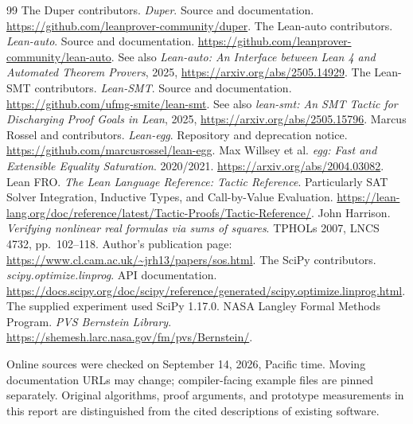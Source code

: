 \documentclass[11pt,letterpaper]{article}
\theoremstyle{definition}
\theoremstyle{remark}
\begin{document}
\begin{thebibliography}{99}
 The Duper contributors. \emph{Duper}. Source and documentation. \url{https://github.com/leanprover-community/duper}.
 The Lean-auto contributors. \emph{Lean-auto}. Source and documentation. \url{https://github.com/leanprover-community/lean-auto}. See also \emph{Lean-auto: An Interface between Lean 4 and Automated Theorem Provers}, 2025, \url{https://arxiv.org/abs/2505.14929}.
 The Lean-SMT contributors. \emph{Lean-SMT}. Source and documentation. \url{https://github.com/ufmg-smite/lean-smt}. See also \emph{lean-smt: An SMT Tactic for Discharging Proof Goals in Lean}, 2025, \url{https://arxiv.org/abs/2505.15796}.
 Marcus Rossel and contributors. \emph{Lean-egg}. Repository and deprecation notice. \url{https://github.com/marcusrossel/lean-egg}.
 Max Willsey et al. \emph{egg: Fast and Extensible Equality Saturation}. 2020/2021. \url{https://arxiv.org/abs/2004.03082}.
 Lean FRO. \emph{The Lean Language Reference: Tactic Reference}. Particularly SAT Solver Integration, Inductive Types, and Call-by-Value Evaluation. \url{https://lean-lang.org/doc/reference/latest/Tactic-Proofs/Tactic-Reference/}.
 John Harrison. \emph{Verifying nonlinear real formulas via sums of squares}. TPHOLs 2007, LNCS 4732, pp.\ 102--118. Author's publication page: \url{https://www.cl.cam.ac.uk/~jrh13/papers/sos.html}.
 The SciPy contributors. \emph{scipy.optimize.linprog}. API documentation. \url{https://docs.scipy.org/doc/scipy/reference/generated/scipy.optimize.linprog.html}. The supplied experiment used SciPy 1.17.0.
 NASA Langley Formal Methods Program. \emph{PVS Bernstein Library}. \url{https://shemesh.larc.nasa.gov/fm/pvs/Bernstein/}.
\end{thebibliography}
\noindent\small Online sources were checked on September 14, 2026, Pacific time. Moving documentation URLs may change; compiler-facing example files are pinned separately. Original algorithms, proof arguments, and prototype measurements in this report are distinguished from the cited descriptions of existing software.
\end{document}
